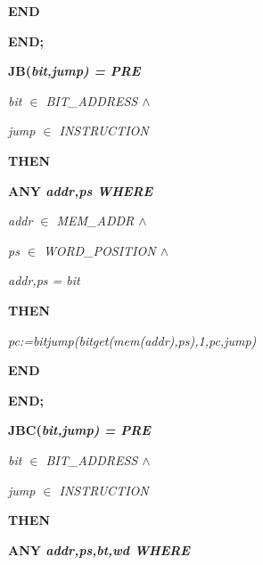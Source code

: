 \begin{sloppypar}
\hspace*{0.20in}\bf END

\hspace*{0.10in}\bf END\rm ;

\hspace*{0.10in}  

\hspace*{0.10in}\bf JB\rm (\it bit\rm ,\it jump\rm ) \rm = \bf PRE

\hspace*{0.20in}\it bit $\in$  \it BIT\_ADDRESS  $\land$ 

\hspace*{0.20in}\it jump $\in$  \it INSTRUCTION

\hspace*{0.10in}\bf THEN

\hspace*{0.20in}\bf ANY \it addr\rm ,\it ps \bf WHERE

\hspace*{0.30in}\it addr $\in$  \it MEM\_ADDR  $\land$ 

\hspace*{0.30in}\it ps $\in$  \it WORD\_POSITION  $\land$ 

\hspace*{0.30in}\it addr\rm ,\it ps \rm = \it bit

\hspace*{0.20in}\bf THEN

\hspace*{0.30in}\it pc\rm :=\it bitjump\rm (\it bitget\rm (\it mem\rm (\it addr\rm )\rm ,\it ps\rm )\rm ,\rm 1\rm ,\it pc\rm ,\it jump\rm )

\hspace*{0.20in}\bf END

\hspace*{0.10in}\bf END\rm ;

\hspace*{0.10in}\bf JBC\rm (\it bit\rm ,\it jump\rm ) \rm = \bf PRE

\hspace*{0.20in}\it bit $\in$  \it BIT\_ADDRESS  $\land$ 

\hspace*{0.20in}\it jump $\in$  \it INSTRUCTION

\hspace*{0.10in}\bf THEN

\hspace*{0.20in}\bf ANY \it addr\rm ,\it ps\rm ,\it bt\rm ,\it wd \bf WHERE


\end{sloppypar}
